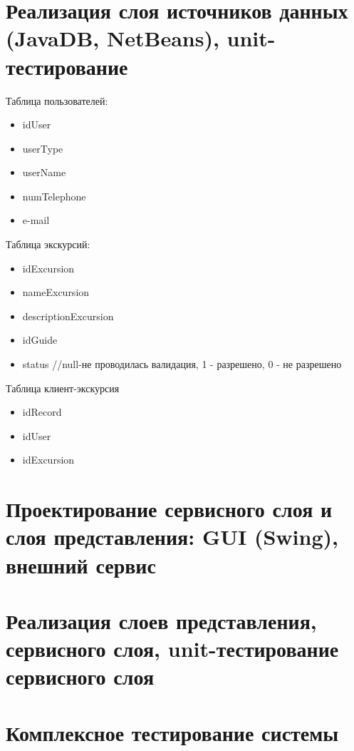 \documentclass[12pt,a4paper]{article}
\begin{document}
\section{Реализация слоя источников данных (JavaDB, NetBeans), unit-тестирование}

Таблица пользователей:
\begin{itemize}
\item idUser
\item userType
\item userName
\item numTelephone
\item e-mail
\end{itemize}

Таблица экскурсий:
\begin{itemize}
\item idExcursion
\item nameExcursion
\item descriptionExcursion
\item idGuide
\item status //null-не проводилась валидация, 1 - разрешено, 0 - не разрешено
\end{itemize}

Таблица клиент-экскурсия
\begin{itemize}
\item idRecord
\item idUser
\item idExcursion
\end{itemize}
\section{Проектирование сервисного слоя и слоя представления: GUI (Swing), внешний сервис}
\section{Реализация слоев представления, сервисного слоя, unit-тестирование сервисного слоя}
\section{Комплексное тестирование системы}
\end{document}
